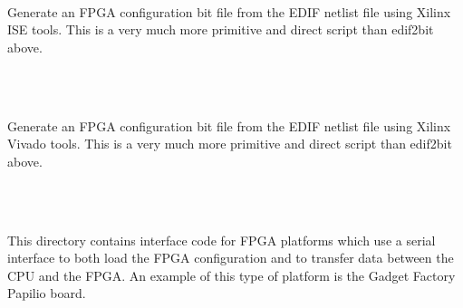 \begin{tabbing}
        \>\>\\
            \>\>\>\>\parbox[t]{12cm}{Generate an FPGA configuration bit file
                from the EDIF netlist file using Xilinx ISE tools. This is
                a very much more primitive and direct script than edif2bit
                above.}\\

        \>\>\\
            \>\>\>\>\parbox[t]{12cm}{Generate an FPGA configuration bit
                file from the EDIF netlist file using Xilinx Vivado
                tools. This is a very much more primitive and direct
                script than edif2bit above.}\\

        \>\>\\
            \>\>\>\>\parbox[t]{12cm}{This directory contains interface code
                for FPGA platforms which use a serial interface to both
                load the FPGA configuration and to transfer data between
                the CPU and the FPGA. An example of this type of platform
                is the Gadget Factory Papilio board.}\\
                

\end{tabbing}

